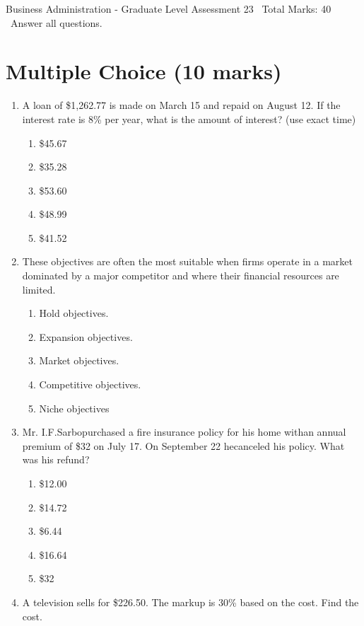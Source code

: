 \documentclass[12pt]{article}
\begin{document}
\begin{center}
Business Administration - Graduate Level Assessment 23 \
Total Marks: 40 \
Answer all questions.
\end{center}

\section*{Multiple Choice (10 marks)}
\begin{enumerate}[label=\arabic*.]
\item A loan of \$1,262.77 is made on March 15 and repaid on August 12. If the interest rate is 8\% per year, what is the amount of interest? (use exact time)
\begin{enumerate}[label=(\alph*)]
    \item \$45.67
    \item \$35.28
    \item \$53.60
    \item \$48.99
    \item \$41.52
\end{enumerate}
\item These objectives are often the most suitable when firms operate in a market dominated by a major competitor and where their financial resources are limited.
\begin{enumerate}[label=(\alph*)]
    \item Hold objectives.
    \item Expansion objectives.
    \item Market objectives.
    \item Competitive objectives.
    \item Niche objectives
\end{enumerate}
\item Mr. I.F.Sarbopurchased a fire insurance policy for his home withan annual premium of \$32 on July 17. On September 22 hecanceled his policy. What was his refund?
\begin{enumerate}[label=(\alph*)]
    \item \$12.00
    \item \$14.72
    \item \$6.44
    \item \$16.64
    \item \$32
\end{enumerate}
\item A television sells for \$226.50. The markup is 30\% based on the cost. Find the cost.
\begin{enumerate}[label=(\alph*)]

\end{enumerate}
\end{enumerate}
\end{document}
